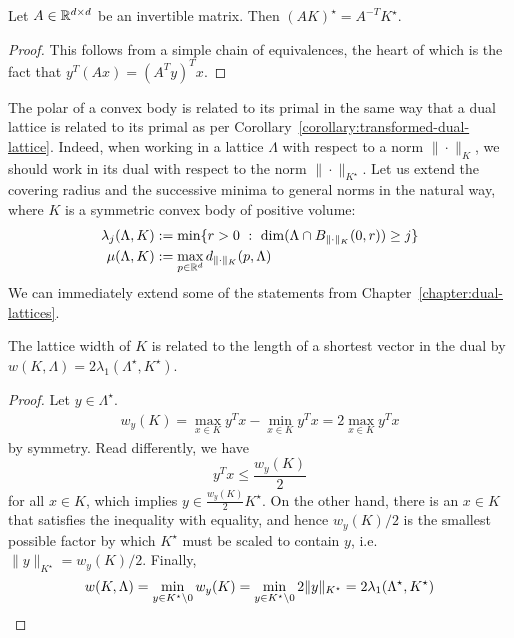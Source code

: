 \begin{lemma}
  Let $A \in \mathbb{R}^{d \times d}$ be an invertible matrix.
  Then $(A K)^\star = A^{-T} K^\star$.
\end{lemma}
\begin{proof}
  This follows from a simple chain of equivalences,
  the heart of which is the fact that $y^T(Ax) = (A^T y)^T x$.
\end{proof}

The polar of a convex body is related to its primal in the same way
that a dual lattice is related to its primal as per Corollary~\ref{corollary:transformed-dual-lattice}.
Indeed, when working in a lattice $\Lambda$ with respect to a norm $\|\cdot\|_K$,
we should work in its dual with respect to the norm $\|\cdot\|_{K^\star}$.
Let us extend the covering radius and the successive minima to general norms in the natural way,
where $K$ is a symmetric convex body of positive volume:
\begin{align*}
  \lambda_j(\Lambda, K) &:= \min\{ r > 0 ~:~ \dim( \Lambda \cap B_{\|\cdot\|_K}(0,r) ) \geq j \} \\
  \mu(\Lambda, K) &:= \max_{p \in \mathbb{R}^d} d_{\|\cdot\|_K}(p, \Lambda)
\end{align*}
We can immediately extend some of the statements from Chapter~\ref{chapter:dual-lattices}.
\begin{lemma}
  The lattice width of $K$ is related to the length of a shortest vector in the dual by
  $w(K,\Lambda) = 2\lambda_1(\Lambda^\star, K^\star)$.
\end{lemma}
\begin{proof}
  Let $y \in \Lambda^\star$.
  \begin{align*}
    w_y(K) = \max_{x \in K} y^Tx - \min_{x \in K} y^Tx = 2 \max_{x \in K} y^Tx
  \end{align*}
  by symmetry.
  Read differently, we have
  \[
    y^Tx \leq \frac{w_y(K)}{2}
  \]
  for all $x \in K$, which implies $y \in \frac{w_y(K)}{2} K^\star$.
  On the other hand, there is an $x \in K$ that satisfies the inequality with equality,
  and hence $w_y(K) / 2$ is the smallest possible factor by which $K^\star$ must be scaled to contain $y$,
  i.e. $\|y\|_{K^\star} = w_y(K) / 2$.
  Finally,
  \[
    w(K,\Lambda) = \min_{y\in K^\star\setminus 0} w_y(K) = \min_{y\in K^\star\setminus 0} 2 \|y\|_{K^\star}
      = 2 \lambda_1(\Lambda^\star, K^\star) \qedhere
  \]
\end{proof}

